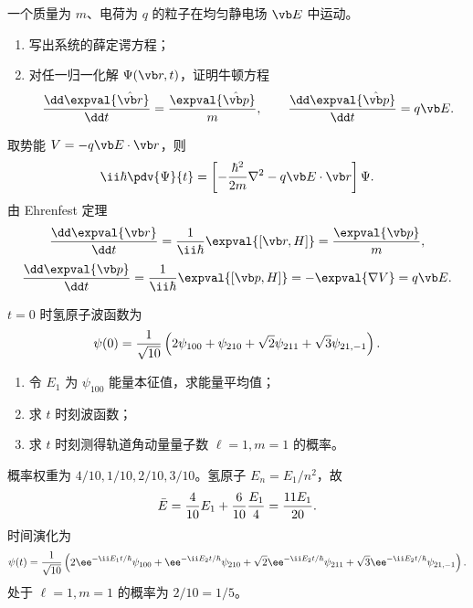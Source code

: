 
\begin{question}
一个质量为 $m$、电荷为 $q$ 的粒子在均匀静电场 $\vb E$ 中运动。
\begin{enumerate}
  \item 写出系统的薛定谔方程；
  \item 对任一归一化解 $\Psi(\vb r,t)$，证明牛顿方程
  \[
    {\dd\expval{\hat{\vb r}}\over\dd t}={\expval{\hat{\vb p}}\over m},
    \qquad {\dd\expval{\hat{\vb p}}\over\dd t}=q\vb E.
  \]
\end{enumerate}
\begin{solution}
取势能 $V=-q\vb E\cdot\vb r$，则
\[
  \ii\hbar\pdv{\Psi}{t}=\left[-{\hbar^2\over2m}\nabla^2-q\vb E\cdot\vb r\right]\Psi.
\]
由 Ehrenfest 定理
\[
  {\dd\expval{\vb r}\over\dd t}={1\over\ii\hbar}\expval{[\vb r,H]}={\expval{\vb p}\over m},
\]
\[
  {\dd\expval{\vb p}\over\dd t}={1\over\ii\hbar}\expval{[\vb p,H]}=-\expval{\nabla V}=q\vb E.
\]
\end{solution}
\end{question}

\begin{question}
$t=0$ 时氢原子波函数为
\[
  \psi(0)={1\over\sqrt{10}}\left(2\psi_{100}+\psi_{210}+\sqrt2\psi_{211}+\sqrt3\psi_{21,-1}\right).
\]
\begin{enumerate}
  \item 令 $E_1$ 为 $\psi_{100}$ 能量本征值，求能量平均值；
  \item 求 $t$ 时刻波函数；
  \item 求 $t$ 时刻测得轨道角动量量子数 $\ell=1,m=1$ 的概率。
\end{enumerate}
\begin{solution}
概率权重为 $4/10,1/10,2/10,3/10$。氢原子 $E_n=E_1/n^2$，故
\[
  \bar E={4\over10}E_1+{6\over10}{E_1\over4}={11E_1\over20}.
\]
时间演化为
\[
  \psi(t)={1\over\sqrt{10}}\left(2\ee^{-\ii E_1t/\hbar}\psi_{100}
  +\ee^{-\ii E_2t/\hbar}\psi_{210}
  +\sqrt2\ee^{-\ii E_2t/\hbar}\psi_{211}
  +\sqrt3\ee^{-\ii E_2t/\hbar}\psi_{21,-1}\right).
\]
处于 $\ell=1,m=1$ 的概率为 $2/10=1/5$。
\end{solution}
\end{question}

